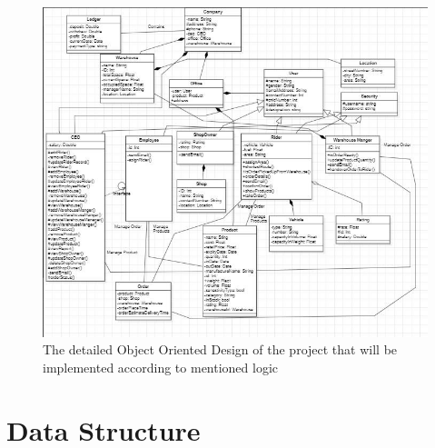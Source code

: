 \documentclass[12pt,a4paper]{report}
\begin{document}
\begin{figure}
  \centering
    \includegraphics[scale=0.8]{./UIs for Latex Reports/UML.jpg}
  \caption{The detailed Object Oriented Design of the project that will be implemented according to mentioned logic}
\end{figure}
\newpage
\chapter {Data Structure}
\end{document}
